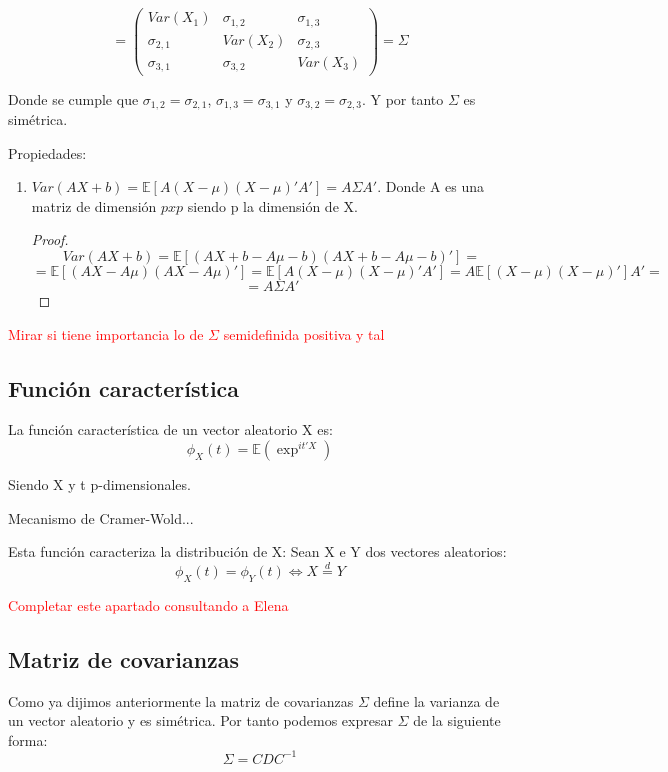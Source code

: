 \documentclass[nochap]{apuntes}
\begin{document}
\begin{itemize}
\[
=\left(
\begin{array}{ccc}
Var(X_1)& \sigma_{1,2}& \sigma_{1,3} \\
\sigma_{2,1}& Var(X_2)& \sigma_{2,3} \\
\sigma_{3,1}& \sigma_{3,2}& Var(X_3)
\end{array}
\right) = \Sigma
\]

Donde se cumple que $\sigma_{1,2}=\sigma_{2,1}$, $\sigma_{1,3}=\sigma_{3,1}$ y $\sigma_{3,2}=\sigma_{2,3}$. Y por tanto $\Sigma$ es simétrica. 
\end{itemize}

Propiedades:
\begin{enumerate}
\item $Var(AX+b) = \mathbb{E}\left[ A(X-\mu)(X-\mu)'A' \right]=A \Sigma A'$.  Donde A es una matriz de dimensión $pxp$ siendo p la dimensión de X.
\begin{proof}
\[
Var(AX+b) = \mathbb{E}\left[ (AX+b-A\mu-b)(AX+b-A\mu-b)' \right] =
\]
\[
 =\mathbb{E}\left[ (AX-A\mu)(AX-A\mu)' \right] = \mathbb{E}\left[A(X-\mu)(X-\mu)'A'\right] = A\mathbb{E}\left[(X-\mu)(X-\mu)'\right]A' = 
 \]
 \[
 =A \Sigma A'
\]

\end{proof}
\end{enumerate}

\textcolor{red}{Mirar si tiene importancia lo de $\Sigma$ semidefinida positiva y tal}

\subsection{Función característica}
La función característica de un vector aleatorio X es:
\[
\phi_X(t)=\mathbb{E}(\exp^{it'X})
\]

Siendo X y t p-dimensionales.

\prop Mecanismo de Cramer-Wold...

Esta función caracteriza la distribución de X:
\prop Sean X e Y dos vectores aleatorios:
\[
\phi_X(t)=\phi_Y(t) \Leftrightarrow X \stackrel{d}{=} Y
\]

\textcolor{red}{Completar este apartado consultando a Elena}

\subsection{Matriz de covarianzas}
Como ya dijimos anteriormente la matriz de covarianzas $\Sigma$ define la varianza de un vector aleatorio y es simétrica. Por tanto podemos expresar $\Sigma$ de la siguiente forma:
\[
\Sigma = CDC^{-1}
\]
\end{document}
